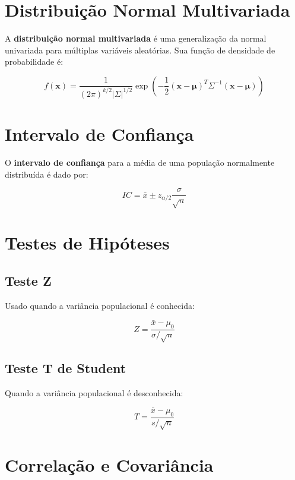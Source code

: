 \documentclass{article}
\begin{document}
\section{Distribuição Normal Multivariada}
A \textbf{distribuição normal multivariada} é uma generalização da normal univariada para múltiplas variáveis aleatórias. Sua função de densidade de probabilidade é:

\begin{equation}
    f(\mathbf{x}) = \frac{1}{(2\pi)^{k/2} |\Sigma|^{1/2}} \exp \left(-\frac{1}{2} (\mathbf{x} - \mathbf{\mu})^T \Sigma^{-1} (\mathbf{x} - \mathbf{\mu}) \right)
\end{equation}

\section{Intervalo de Confiança}
O \textbf{intervalo de confiança} para a média de uma população normalmente distribuída é dado por:

\begin{equation}
    IC = \bar{x} \pm z_{\alpha/2} \frac{\sigma}{\sqrt{n}}
\end{equation}

\section{Testes de Hipóteses}

\subsection{Teste Z}
Usado quando a variância populacional é conhecida:

\begin{equation}
    Z = \frac{\bar{x} - \mu_0}{\sigma / \sqrt{n}}
\end{equation}

\subsection{Teste T de Student}
Quando a variância populacional é desconhecida:

\begin{equation}
    T = \frac{\bar{x} - \mu_0}{s / \sqrt{n}}
\end{equation}

\section{Correlação e Covariância}
\end{document}
